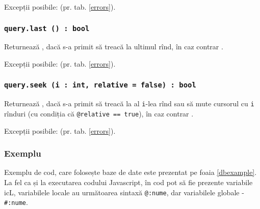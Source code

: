 Excepții posibile:  (pr. tab. \ref{errors}).

\subsubsection{\texttt{query.last () : bool}}

Returnează \true, dacă s-a primit să treacă la ultimul rînd, în caz contrar \false.

Excepții posibile:  (pr. tab. \ref{errors}).

\subsubsection{\texttt{query.seek (i : int, relative = false) : bool}}

Returnează \true, dacă s-a primit să treacă la al \texttt{i}-lea rînd sau să mute cursorul cu \texttt{i} rînduri (cu condiția că \texttt{@relative == true}), în caz contrar \false.

Excepții posibile:  (pr. tab. \ref{errors}).

\subsubsection{Exemplu}

Exemplu de cod, care folosește baze de date este prezentat pe foaia \ref{dbexample}. La fel ca și la executarea codului Javascript, în cod pot să fie prezente variabile icL, variabilele locale au următoarea sintaxă \texttt{@:nume}, dar variabilele globale - \texttt{#:nume}.

\begin{sourcecode}
    \label{dbexample}
    \inputminted[linenos]{icl}{../sources/dbexample.icL}
\end{sourcecode}

